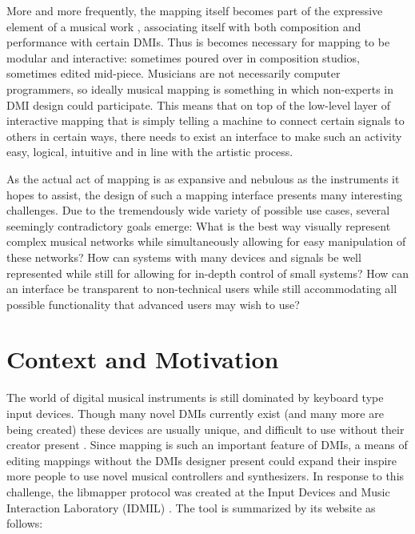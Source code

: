 More and more frequently, the mapping itself becomes part of the expressive element of a musical work ,
associating itself with both composition and performance with certain DMIs. Thus is becomes necessary for mapping to be modular and interactive: sometimes poured over in composition studios, sometimes edited mid-piece. Musicians are not necessarily computer programmers, so ideally musical mapping is something in which non-experts in DMI design could participate. This means that on top of the low-level layer of interactive mapping that is simply telling a machine to connect certain signals to others in certain ways, there needs to exist an interface to make such an activity easy, logical, intuitive and in line with the artistic process.

As the actual act of mapping is as expansive and nebulous as the instruments it hopes to assist, the design of such a mapping interface presents many interesting challenges. Due to the tremendously wide variety of possible use cases, several seemingly contradictory goals emerge: What is the best way visually represent complex musical networks while simultaneously allowing for easy manipulation of these networks? How can systems with many devices and signals be well represented while still for allowing for in-depth control of small systems? How can an interface be transparent to non-technical users while still accommodating all possible functionality that advanced users may wish to use? 


\section{Context and Motivation}

The world of digital musical instruments is still dominated by keyboard type input devices. Though many novel DMIs currently exist (and many more are being created) these devices are usually unique, and difficult to use without their creator present \cite{squeezevox}.
Since mapping is such an important feature of DMIs, a means of editing mappings without the DMIs designer present could expand their inspire more people to use novel musical controllers and synthesizers. In response to this challenge, the libmapper protocol was created at the Input Devices and Music Interaction Laboratory (IDMIL) . The tool is summarized by its website as follows:

